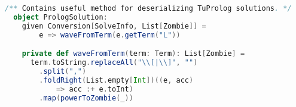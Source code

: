\begin{lstlisting}[language=Scala, label=code:prolog-solution, caption=Oggetto di utility per deserializzare le soluzioni TuProlog.]    
  /** Contains useful method for deserializing TuProlog solutions. */
  object PrologSolution:
    given Conversion[SolveInfo, List[Zombie]] =
        e => waveFromTerm(e.getTerm("L"))

    private def waveFromTerm(term: Term): List[Zombie] =
      term.toString.replaceAll("\\[|\\]", "")
        .split(",")
        .foldRight(List.empty[Int])((e, acc) 
            => acc :+ e.toInt)
        .map(powerToZombie(_))
\end{lstlisting}


